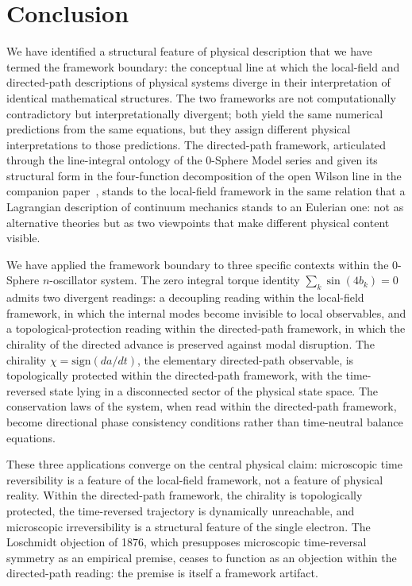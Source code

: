 \documentclass[%
 reprint, amsmath,amssymb, aps, prb, ]{revtex4-2}
\numberwithin{equation}{section}
\begin{document}
\section{Conclusion}
\label{sec:conclusion}

We have identified a structural feature of physical description that we have termed the framework boundary: the conceptual line at which the local-field and directed-path descriptions of physical systems diverge in their interpretation of identical mathematical structures. The two frameworks are not computationally contradictory but interpretationally divergent; both yield the same numerical predictions from the same equations, but they assign different physical interpretations to those predictions. The directed-path framework, articulated through the line-integral ontology of the 0-Sphere Model series and given its structural form in the four-function decomposition of the open Wilson line in the companion paper~\cite{hanamura55}, stands to the local-field framework in the same relation that a Lagrangian description of continuum mechanics stands to an Eulerian one: not as alternative theories but as two viewpoints that make different physical content visible.

We have applied the framework boundary to three specific contexts within the 0-Sphere $n$-oscillator system. The zero integral torque identity $\sum_k \sin(4 b_k) = 0$ admits two divergent readings: a decoupling reading within the local-field framework, in which the internal modes become invisible to local observables, and a topological-protection reading within the directed-path framework, in which the chirality of the directed advance is preserved against modal disruption. The chirality $\chi = \mathrm{sign}(da/dt)$, the elementary directed-path observable, is topologically protected within the directed-path framework, with the time-reversed state lying in a disconnected sector of the physical state space. The conservation laws of the system, when read within the directed-path framework, become directional phase consistency conditions rather than time-neutral balance equations.

These three applications converge on the central physical claim: microscopic time reversibility is a feature of the local-field framework, not a feature of physical reality. Within the directed-path framework, the chirality is topologically protected, the time-reversed trajectory is dynamically unreachable, and microscopic irreversibility is a structural feature of the single electron. The Loschmidt objection of 1876, which presupposes microscopic time-reversal symmetry as an empirical premise, ceases to function as an objection within the directed-path reading: the premise is itself a framework artifact.
\end{document}
